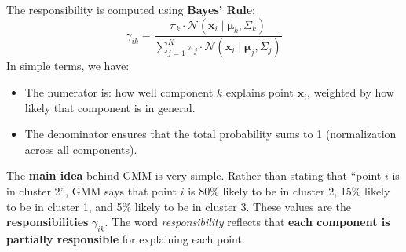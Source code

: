 \newpage

\noindent
The responsibility is computed using \textbf{Bayes' Rule}:
\begin{equation}
    \gamma_{ik} = \dfrac{
        \pi_k \cdot \mathcal{N}\left(\mathbf{x}_i \mid \boldsymbol{\mu}_k, \Sigma_k\right)
    }{
        \displaystyle\sum_{j=1}^{K} \pi_{j} \cdot \mathcal{N}\left(\mathbf{x}_{i} \mid \boldsymbol{\mu}_{j}, \Sigma_{j}\right)
    }
\end{equation}
In simple terms, we have:
\begin{itemize}
    \item The numerator is: how well component $k$ explains point $\mathbf{x}_{i}$, weighted by how likely that component is in general.
    \item The denominator ensures that the total probability sums to 1 (normalization across all components).
\end{itemize}

\highspace
The \textbf{main idea} behind GMM is very simple. Rather than stating that ``point $i$ is in cluster 2'', GMM says that point $i$ is 80\% likely to be in cluster 2, 15\% likely to be in cluster 1, and 5\% likely to be in cluster 3. These values are the \textbf{responsibilities} $\gamma_{ik}$. The word \emph{responsibility} reflects that \textbf{each component is partially responsible} for explaining each point.